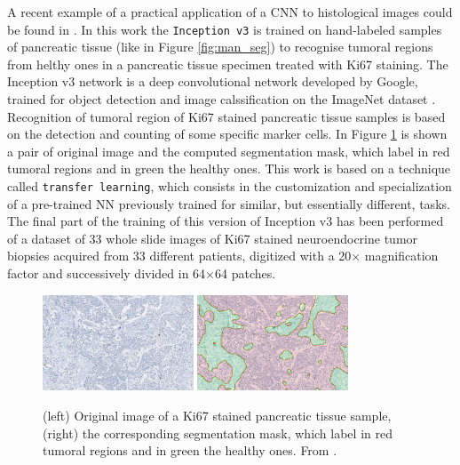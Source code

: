\documentclass[12pt,a4paper]{report}
\begin{document}
A recent example of a practical application of a CNN to histological images could be found in \cite{Ki67}. In this work the \texttt{Inception v3} is trained on hand-labeled samples of pancreatic tissue (like in Figure \ref{fig:man_seg}) to recognise tumoral regions from helthy ones in a pancreatic tissue specimen treated with Ki67 staining. The Inception v3 \cite{ravindran2018classification} network is a deep convolutional network developed by Google, trained for object detection and image calssification on the ImageNet dataset \cite{5206848}. Recognition of tumoral region of Ki67 stained pancreatic tissue samples is based on the detection and counting of some specific marker cells. In Figure \ref{fig:autom_seg} is shown a pair of original image and the computed segmentation mask, which label in red tumoral regions and in green the healthy ones. This work is based on a technique called \texttt{transfer learning}, which consists in the customization and specialization of a pre-trained NN previously trained for similar, but essentially different, tasks. The final part of the training of this version of Inception v3 has been performed of a dataset of 33 whole slide images of Ki67 stained neuroendocrine tumor biopsies acquired from 33 different patients, digitized with a 20$\times$ magnification factor and successively divided in 64$\times$64 patches.

    \begin{figure}
        \centering
        \includegraphics[width = 0.4\textwidth]{images/PancTissue}
        \includegraphics[width = 0.4\textwidth]{images/PancTissueSeg}
        \caption{(left) Original image of a Ki67 stained pancreatic tissue sample, (right) the corresponding segmentation mask, which label in red tumoral regions and in green the healthy ones. From \cite{Ki67}.}
        \label{fig:autom_seg}
    \end{figure}
\end{document}
